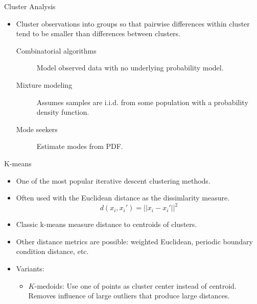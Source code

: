 \documentclass{beamer}
\begin{document}
\begin{frame}{Cluster Analysis}
    \begin{itemize}
        \item Cluster observations into groups so that pairwise differences within cluster tend to be smaller than differences between clusters.
        \begin{description}
        \item[Combinatorial algorithms] Model observed data with no underlying probability model.
        \item[Mixture modeling] Assumes samples are i.i.d. from some population with a probability density function.
        \item[Mode seekers] Estimate modes from PDF.
        \end{description}
    \end{itemize}
\end{frame}

\begin{frame}{K-means}
    \begin{itemize}
        \item One of the most popular iterative descent clustering methods.
        \item Often used with the Euclidean distance as the dissimlarity measure.
        \begin{equation*}
            d(x_i, x_i') = ||x_i - x_i'||^2
        \end{equation*}
        \item Classic k-means measure distance to centroids of clusters.
        \item Other distance metrics are possible: weighted Euclidean, periodic boundary condition distance, etc.
        \item Variants:
        \begin{itemize}
            \item $K$-medoids: Use one of points as cluster center instead of centroid. Removes influence of large outliers that produce large distances.
        \end{itemize}
    \end{itemize}
\end{frame}
\end{document}
